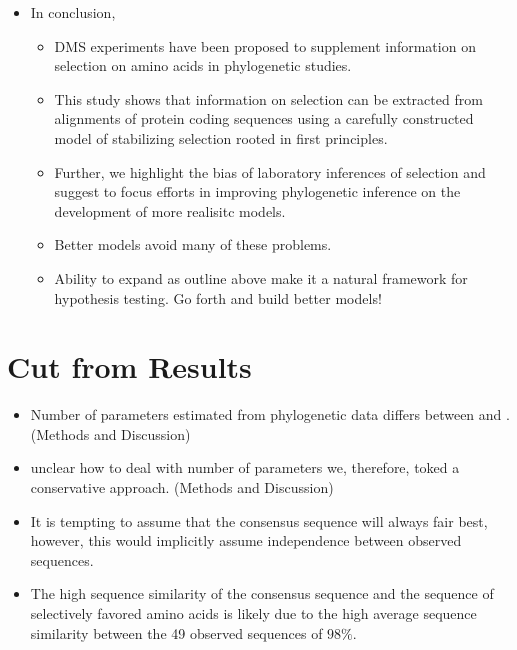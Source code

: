 \documentclass[12pt]{article}
\begin{document}
\begin{itemize}
\item In conclusion,
  \begin{itemize}
  \item DMS experiments have been proposed to supplement information on selection on amino acids in phylogenetic studies.
  \item This study shows that information on selection can be extracted from alignments of protein coding sequences using a carefully constructed model of stabilizing selection rooted in first principles.
  \item Further, we highlight the bias of laboratory inferences of selection and suggest to focus efforts in improving phylogenetic inference on the development of more realisitc models.
  \item Better models avoid many of these problems.
  \item Ability to expand \selac as outline above make it a natural framework for hypothesis testing.  Go forth and build better models!
  \end{itemize}
\end{itemize}



\section*{Cut from Results}
\begin{itemize}
\item Number of parameters estimated from phylogenetic data differs between \selac and \phydms. (Methods and Discussion)
\item unclear how to deal with number of parameters we, therefore, toked a conservative approach. (Methods and Discussion)
  \item It is tempting to assume that the consensus sequence will always fair best, however, this would implicitly assume independence between observed sequences.
\item The high sequence similarity of the consensus sequence and the sequence of selectively favored amino acids is likely due to the high average sequence similarity between the 49 observed sequences of $98 \%$.
\end{itemize}
\end{document}
